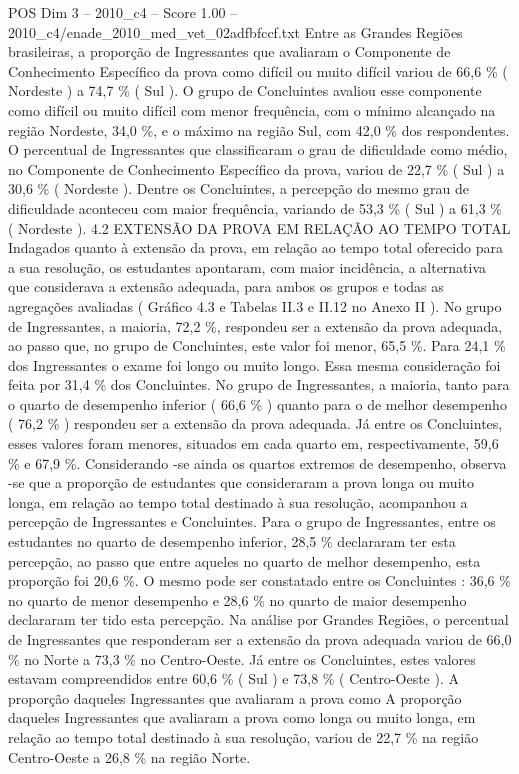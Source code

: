 \begin{textsample}{POS Dim 3 – 2010\_c4 – Score 1.00 – 2010\_c4/enade\_2010\_med\_vet\_02adfbfccf.txt}
Entre as Grandes Regiões brasileiras, a proporção de Ingressantes que avaliaram o Componente de Conhecimento Específico da prova como difícil ou muito difícil variou de 66,6 \% ( Nordeste ) a 74,7 \% ( Sul ).
O grupo de Concluintes avaliou esse componente como difícil ou muito difícil com menor frequência, com o mínimo alcançado na região Nordeste, 34,0 \%, e o máximo na região Sul, com 42,0 \% dos respondentes.
O percentual de Ingressantes que classificaram o grau de dificuldade como médio, no Componente de Conhecimento Específico da prova, variou de 22,7 \% ( Sul ) a 30,6 \% ( Nordeste ).
Dentre os Concluintes, a percepção do mesmo grau de dificuldade aconteceu com maior frequência, variando de 53,3 \% ( Sul ) a 61,3 \% ( Nordeste ). 4.2 EXTENSÃO DA PROVA EM RELAÇÃO AO TEMPO TOTAL Indagados quanto à extensão da prova, em relação ao tempo total oferecido para a sua resolução, os estudantes apontaram, com maior incidência, a alternativa que considerava a extensão adequada, para ambos os grupos e todas as agregações avaliadas ( Gráfico 4.3 e Tabelas II.3 e II.12 no Anexo II ).
No grupo de Ingressantes, a maioria, 72,2 \%, respondeu ser a extensão da prova adequada, ao passo que, no grupo de Concluintes, este valor foi menor, 65,5 \%.
Para 24,1 \% dos Ingressantes o exame foi longo ou muito longo.
Essa mesma consideração foi feita por 31,4 \% dos Concluintes.
No grupo de Ingressantes, a maioria, tanto para o quarto de desempenho inferior ( 66,6 \% ) quanto para o de melhor desempenho ( 76,2 \% ) respondeu ser a extensão da prova adequada.
Já entre os Concluintes, esses valores foram menores, situados em cada quarto em, respectivamente, 59,6 \% e 67,9 \%.
Considerando -se ainda os quartos extremos de desempenho, observa -se que a proporção de estudantes que consideraram a prova longa ou muito longa, em relação ao tempo total destinado à sua resolução, acompanhou a percepção de Ingressantes e Concluintes.
Para o grupo de Ingressantes, entre os estudantes no quarto de desempenho inferior, 28,5 \% declararam ter esta percepção, ao passo que entre aqueles no quarto de melhor desempenho, esta proporção foi 20,6 \%.
O mesmo pode ser constatado entre os Concluintes : 36,6 \% no quarto de menor desempenho e 28,6 \% no quarto de maior desempenho declararam ter tido esta percepção.
Na análise por Grandes Regiões, o percentual de Ingressantes que responderam ser a extensão da prova adequada variou de 66,0 \% no Norte a 73,3 \% no Centro-Oeste.
Já entre os Concluintes, estes valores estavam compreendidos entre 60,6 \% ( Sul ) e 73,8 \% ( Centro-Oeste ).
A proporção daqueles Ingressantes que avaliaram a prova como A proporção daqueles Ingressantes que avaliaram a prova como longa ou muito longa, em relação ao tempo total destinado à sua resolução, variou de 22,7 \% na região Centro-Oeste a 26,8 \% na região Norte.

\end{textsample}
